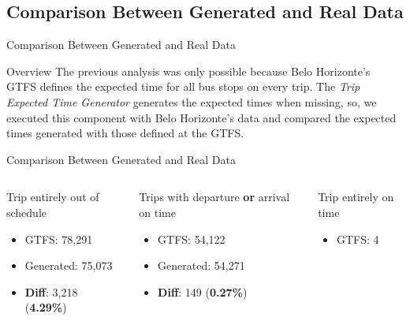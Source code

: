 \documentclass[xcolor=dvipsnames,table]{beamer}
\begin{document}
\subsection{Comparison Between Generated and Real Data}
\begin{frame}{Comparison Between Generated and Real Data}
        \begin{block}{Overview} 
                The previous analysis was only possible because Belo Horizonte's GTFS defines the expected time for all bus stops on every trip. The \textit{Trip Expected Time Generator} generates the expected times when missing, so, we executed this component with Belo Horizonte's data and compared the expected times generated
with those defined at the GTFS.
        \end{block}
\end{frame}
\begin{frame}{Comparison Between Generated and Real Data}
        \begin{columns}
                \begin{block}{Trip entirely out of schedule} 
                        \begin{itemize}
                                \item GTFS: 78,291 
                                \item Generated: 75,073 
                                \item \textbf{Diff}: 3,218 (\textbf{4.29\%})
                        \end{itemize}
                \end{block}
                \begin{block}{Trips with departure \textbf{or} arrival on time} 
                        \begin{itemize}
                                \item GTFS: 54,122 
                                \item Generated: 54,271 
                                \item \textbf{Diff}: 149 (\textbf{0.27\%}) 
                        \end{itemize}
                \end{block}
                \begin{block}{Trip entirely on time} 
                        \begin{itemize}
                                \item GTFS: 4

\end{itemize}
\end{block}
\end{columns}
\end{frame}
\end{document}

